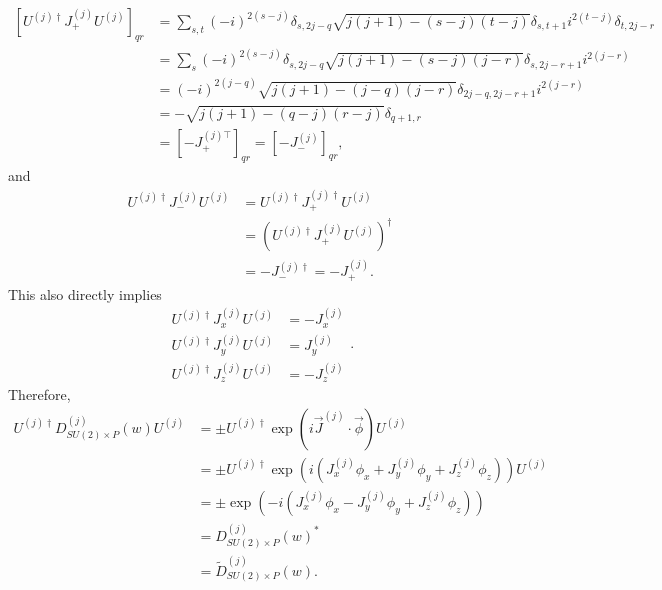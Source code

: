 \documentclass[12pt]{revtex4-2}
\begin{document}
\begin{equation}
    \begin{aligned}
        \left[U^{(j)\dagger}J_+^{(j)}U^{(j)}\right]_{qr} &= \sum_{s,t}(-i)^{2(s-j)}\delta_{s,2j-q}\sqrt{j(j+1)-(s-j)(t-j)}\delta_{s,t+1}i^{2(t-j)}\delta_{t,2j-r} \\
        &= \sum_{s}(-i)^{2(s-j)}\delta_{s,2j-q}\sqrt{j(j+1)-(s-j)(j-r)}\delta_{s,2j-r+1}i^{2(j-r)} \\
        &= (-i)^{2(j-q)}\sqrt{j(j+1)-(j-q)(j-r)}\delta_{2j-q,2j-r+1}i^{2(j-r)} \\
        &= -\sqrt{j(j+1)-(q-j)(r-j)}\delta_{q+1,r} \\
        &= \left[-J_+^{(j)\top}\right]_{qr} = \left[-J_-^{(j)}\right]_{qr},
    \end{aligned}
\end{equation}
and
\begin{equation}
    \begin{aligned}
        U^{(j)\dagger}J_-^{(j)}U^{(j)} &= U^{(j)\dagger}J_+^{(j)\dagger}U^{(j)} \\
        &= \left(U^{(j)\dagger}J_+^{(j)}U^{(j)}\right)^\dagger \\
        &= -J_-^{(j)\dagger} = -J_+^{(j)}.
    \end{aligned}
\end{equation}
This also directly implies
\begin{equation}
    \begin{aligned}
        U^{(j)\dagger}J_x^{(j)}U^{(j)} &= -J_x^{(j)} \\
        U^{(j)\dagger}J_y^{(j)}U^{(j)} &= J_y^{(j)} \\
        U^{(j)\dagger}J_z^{(j)}U^{(j)} &= -J_z^{(j)}
    \end{aligned}.
\end{equation}
Therefore,
\begin{equation}
    \begin{aligned}
        U^{(j)\dagger}D^{(j)}_{SU(2)\times P}(w)U^{(j)} &= \pm U^{(j)\dagger}\exp(i\vec{J}^{(j)}\cdot\vec{\phi})U^{(j)} \\ 
        &= \pm U^{(j)\dagger}\exp(i(J_x^{(j)}\phi_x+J_y^{(j)}\phi_y+J_z^{(j)}\phi_z))U^{(j)} \\
        &= \pm\exp(-i(J_x^{(j)}\phi_x-J_y^{(j)}\phi_y+J_z^{(j)}\phi_z)) \\
        &= D^{(j)}_{SU(2)\times P}(w)^\ast \\
        &= \tilde{D}^{(j)}_{SU(2)\times P}(w).
    \end{aligned}
\end{equation}
\end{document}
